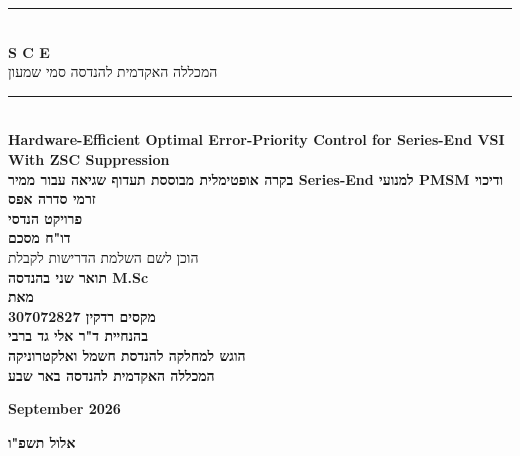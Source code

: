 \documentclass[a4paper,12pt]{article}
\begin{document}
\begin{titlepage}
    \centering
    
    \rule{\textwidth}{1pt}\\[0.5cm]
    {\Huge\textbf{S C E}}\\[0.2cm]
    {\small המכללה האקדמית להנדסה סמי שמעון}\\[0.3cm]
    \rule{\textwidth}{1pt}\\[1.5cm]
    
    {\LARGE \textbf{Hardware-Efficient Optimal Error-Priority Control for Series-End VSI With ZSC Suppression}}\\[0.6cm]
    
    {\Large \textbf{בקרה אופטימלית מבוססת תעדוף שגיאה עבור ממיר Series-End למנועי PMSM ודיכוי זרמי סדרה אפס}}\\[0.8cm]
    
    {\LARGE \textbf{פרויקט הנדסי}}\\[0.5cm]
    {\Large \textbf{דו"ח מסכם}}\\[1.2cm]
    
    {\large הוכן לשם השלמת הדרישות לקבלת}\\[0.2cm]
    {\large \textbf{תואר שני בהנדסה M.Sc}}\\[1.0cm]
    
    {\large \textbf{מאת}}\\[0.4cm]
    {\Large \textbf{מקסים רדקין 307072827}}\\[1.0cm]
    
    {\large \textbf{בהנחיית ד"ר אלי גד ברבי}}\\[1.5cm]
    
    {\large \textbf{הוגש למחלקה להנדסת חשמל ואלקטרוניקה}}\\[0.2cm]
    {\large \textbf{המכללה האקדמית להנדסה באר שבע}}\\[1.8cm]
    
    \vfill
    
    \begin{minipage}{0.48\textwidth}
        \flushleft
        \textbf{September 2026}
    \end{minipage}
    \hfill
    \begin{minipage}{0.48\textwidth}
        \flushright
        \textbf{אלול תשפ"ו}
    \end{minipage}

\end{titlepage}
\end{document}
